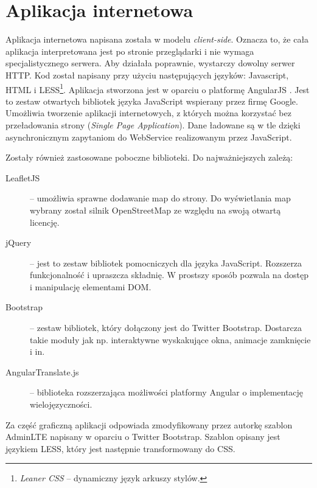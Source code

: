 \documentclass[a4paper]{book}
\begin{document}
		\section{Aplikacja internetowa} 
		\label{id:sec:web}
		Aplikacja internetowa napisana została w modelu \emph{client-side}. Oznacza to, że cała aplikacja interpretowana jest po stronie przeglądarki i nie wymaga specjalistycznego serwera. Aby działała poprawnie, wystarczy dowolny serwer HTTP. Kod został napisany przy użyciu następujących języków: Javascript, HTML i LESS\footnote{\emph{Leaner CSS} -- dynamiczny język arkuszy stylów.}. 
		Aplikacja stworzona jest w oparciu o platformę AngularJS \cite{keylist}. Jest to zestaw otwartych bibliotek języka JavaScript wspierany przez firmę Google. Umożliwia tworzenie aplikacji internetowych, z których można korzystać bez przeładowania strony (\emph{Single Page Application}). Dane ładowane są w tle dzięki asynchronicznym zapytaniom do WebService realizowanym przez JavaScript.
		
		Zostały również zastosowane poboczne biblioteki. Do najważniejszych zależą:
		
		\begin{description}
			
			\item[LeafletJS] \cite{id:Leaflet} -- 
			umożliwia sprawne dodawanie map do strony. Do wyświetlania map wybrany został silnik OpenStreetMap \cite{id:OpenStreetMaps} ze względu na swoją otwartą licencję.
			\item[jQuery] \cite{id:jQuery} -- 
			jest to zestaw bibliotek pomocniczych dla języka JavaScript. Rozszerza funkcjonalność i upraszcza składnię. W prostszy sposób pozwala na dostęp i manipulację elementami DOM.
			\item[Bootstrap] \cite{id:Bootstrap} -- 
			zestaw bibliotek, który dołączony jest do Twitter Bootstrap. Dostarcza takie moduły jak np. interaktywne wyskakujące okna, animacje zamknięcie i in.
			\item[AngularTranslate.js] \cite{id:AngularTranslate} -- 
			biblioteka rozszerzająca możliwości platformy Angular o implementację wielojęzyczności.  
		
		\end{description}
				
		Za część graficzną aplikacji odpowiada zmodyfikowany przez autorkę szablon AdminLTE \cite{id:AdminLTE} napisany w oparciu o Twitter Bootstrap. Szablon opisany jest językiem LESS, który jest następnie transformowany do CSS.
		
\end{document}
